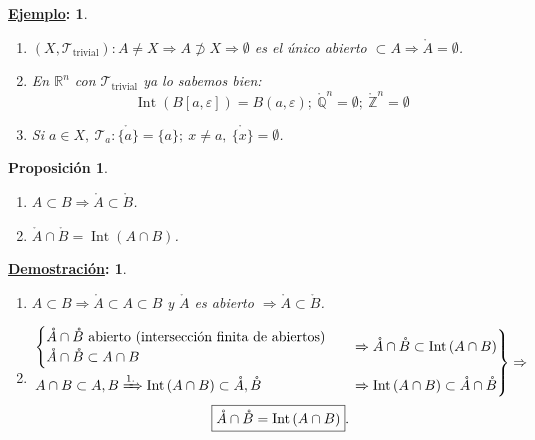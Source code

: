 \documentclass[10pt,a4paper,openright]{book}
\theoremstyle{break}
\newtheorem*{prop}{Proposición}
\newtheorem*{demo}{\underline{Demostración}:}
\newtheorem*{ej}{\underline{Ejemplo}:}
\DeclareMathOperator{\inter}{Int}
\begin{document}
\begin{ej}
\begin{enumerate}
    \item $\left( X, \mathcal{T}_{\text{trivial}} \right): A \neq X \Rightarrow A \not \supset X \Rightarrow \emptyset$ es el único abierto $\subset A \Rightarrow \mathring{A} = \emptyset$.

    \item En $\mathbb{R}^n$ con $\mathcal{T}_{\text{trivial}}$ ya lo sabemos bien:
    \[
    \inter\left( B\left[ a, \varepsilon \right] \right)  = B\left( a, \varepsilon \right);\ \mathring{\mathbb{Q}}^n = \emptyset;\ \mathring{\mathbb{Z}}^n = \emptyset
    \]
    \item Si $a \in X,\ \mathcal{T}_a : \mathring{\{a\}} = \{a\};\ x \neq a,\ \mathring{\{x\}} = \emptyset$.
\end{enumerate}
\end{ej}

\begin{prop}
\begin{enumerate}
    \item $A \subset B \Rightarrow \mathring{A} \subset \mathring{B}$.
    \item $\mathring{A} \cap \mathring{B} = \inter \left( A \cap B \right)$.
\end{enumerate}
\end{prop}
\begin{demo}
\begin{enumerate}
    \item $A \subset B \Rightarrow \mathring{A} \subset A \subset B$ y $\mathring{A}$ es abierto $\Rightarrow \mathring{A} \subset \mathring{B}$. 
    \item 
    \begin{gather*}
    \begin{rcases}
    \begin{cases}
        \mathring{A} \cap \mathring{B} \text{ abierto (intersección finita de abiertos)}\\
        \mathring{A} \cap \mathring{B} \subset A \cap B 
    \end{cases} &\Rightarrow \mathring{A} \cap \mathring{B} \subset \inter \left( A \cap B \right)\\
    A \cap B \subset A, B \xRightarrow{1.} \inter \left( A \cap B \right) \subset \mathring{A}, \mathring{B} &\Rightarrow \inter\left( A \cap B \right) \subset \mathring{A} \cap \mathring{B}
    \end{rcases} \Rightarrow\\
    \boxed{\mathring{A} \cap \mathring{B} = \inter\left( A \cap B \right)} 
    .\end{gather*}
\end{enumerate}
\end{demo}
\end{document}
